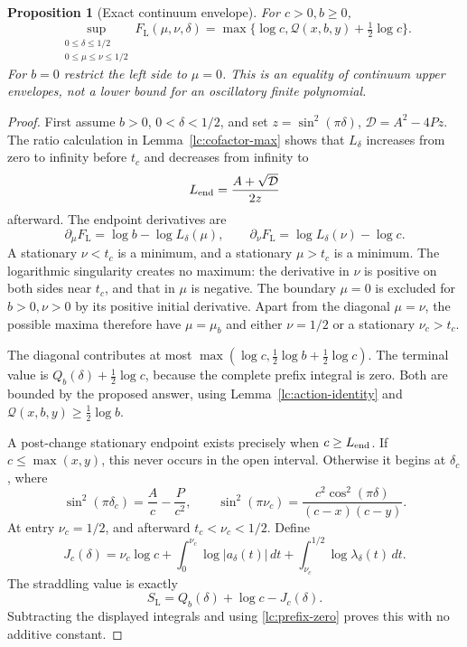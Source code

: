 \documentclass[11pt]{article}
\numberwithin{equation}{section}
\newtheorem{proposition}[theorem]{Proposition}
\theoremstyle{remark}\newtheorem{remark}[theorem]{Remark}
\begin{document}
\begin{proposition}[Exact continuum envelope]\label{lc:left-maximum}
For \(c>0,b\ge0\),
\begin{equation}\label{lc:left-envelope}
 \sup_{\substack{0\le\delta\le1/2\\0\le\mu\le\nu\le1/2}}
 F_{\mathrm L}(\mu,\nu,\delta)
       =\max\{\log c,\mathcal Q(x,b,y)+\tfrac12\log c\}.
\end{equation}
For \(b=0\) restrict the left side to \(\mu=0\).
This is an equality of continuum upper envelopes, not a lower
bound for an oscillatory finite polynomial.
\end{proposition}
\begin{proof}
First assume \(b>0\), \(0<\delta<1/2\), and set
\(z=\sin^2(\pi\delta)\), \(\mathcal D=A^2-4Pz\).
The ratio calculation in Lemma~\ref{lc:cofactor-max} shows that
\(L_\delta\) increases from zero to infinity before \(t_c\) and
decreases from infinity to
\[
                         L_{\rm end}=\frac{A+\sqrt{\mathcal D}}{2z}
\]
afterward. The endpoint derivatives are
\[
 \partial_\mu F_{\mathrm L}=\log b-\log L_\delta(\mu),\qquad
 \partial_\nu F_{\mathrm L}=\log L_\delta(\nu)-\log c.
\]
A stationary \(\nu<t_c\) is a minimum, and a stationary \(\mu>t_c\)
is a minimum. The logarithmic singularity creates no maximum:
the derivative in \(\nu\) is positive on both sides near \(t_c\),
and that in \(\mu\) is negative. The boundary \(\mu=0\) is excluded
for \(b>0,\nu>0\) by its positive initial derivative.
Apart from the diagonal \(\mu=\nu\), the possible maxima therefore
have \(\mu=\mu_b\) and either \(\nu=1/2\) or a stationary
\(\nu_c>t_c\).

The diagonal contributes at most
\(\max(\log c,\frac12\log b+\frac12\log c)\).
The terminal value is \(Q_b(\delta)+\frac12\log c\), because the
complete prefix integral is zero. Both are bounded by the proposed
answer, using Lemma~\ref{lc:action-identity} and
\(\mathcal Q(x,b,y)\ge\frac12\log b\).

A post-change stationary endpoint exists precisely when
\(c\ge L_{\rm end}\). If \(c\le\max(x,y)\), this never occurs
in the open interval. Otherwise it begins at \(\delta_c\), where
\begin{equation}\label{lc:nu-c}
 \sin^2(\pi\delta_c)=\frac Ac-\frac P{c^2},\qquad
 \sin^2(\pi\nu_c)
       =\frac{c^2\cos^2(\pi\delta)}{(c-x)(c-y)}.
\end{equation}
At entry \(\nu_c=1/2\), and afterward \(t_c<\nu_c<1/2\).
Define
\[
 J_c(\delta)=\nu_c\log c+
 \int_0^{\nu_c}\log|a_\delta(t)|\,dt+
 \int_{\nu_c}^{1/2}\log\lambda_\delta(t)\,dt.
\]
The straddling value is exactly
\begin{equation}\label{lc:straddling}
                  S_{\mathrm L}=Q_b(\delta)+\log c-J_c(\delta).
\end{equation}
Subtracting the displayed integrals and using
\eqref{lc:prefix-zero} proves this with no additive constant.


\end{proof}
\end{document}
